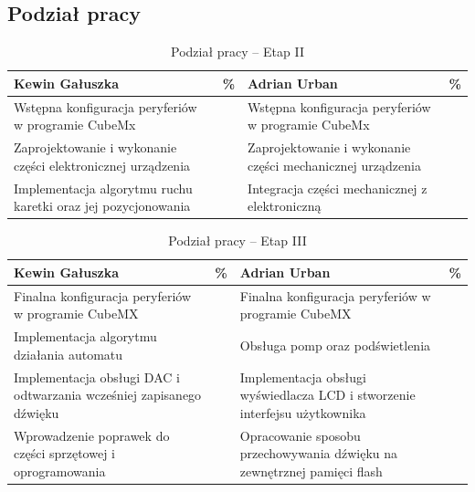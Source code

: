 \documentclass[10pt, a4paper]{article}
\begin{document}
\subsection{Podział pracy}

\textbf{}


\begin{table}[H]
	\centering
	\begin{tabular}{|L{7cm}|L{0.8cm}||L{7cm}|L{0.8cm}|}
		\hline
		\hline
		\textbf{Kewin Gałuszka} & 
		\% & 
		\textbf{Adrian Urban} & \%\\
		\hline
		\hline
		Wstępna konfiguracja peryferiów w programie CubeMx		& &	
		Wstępna konfiguracja peryferiów w programie CubeMx &\\
		
		\hline
		Zaprojektowanie i wykonanie części elektronicznej urządzenia& &
		Zaprojektowanie i wykonanie części mechanicznej urządzenia  & \\
		\hline
    	Implementacja algorytmu ruchu karetki oraz jej pozycjonowania & &
		Integracja części mechanicznej z elektroniczną &\\
		\hline
	\end{tabular}
	\caption{Podział pracy -- Etap II}
	\label{tab:PodzialPracyEtap2}
\end{table}

\begin{table}[H]
	\centering
	\begin{tabular}{|L{7cm}|L{0.8cm}||L{7cm}|L{0.8cm}|}
		\hline
		\hline
		\textbf{Kewin Gałuszka} & 
		\% & 
		\textbf{Adrian Urban} & \%\\
		\hline
		\hline
		Finalna konfiguracja peryferiów w programie CubeMX		& &	
		Finalna konfiguracja peryferiów w programie CubeMX &\\
		\hline
		Implementacja algorytmu działania automatu & &
		Obsługa pomp oraz podświetlenia &\\
		\hline
		Implementacja obsługi DAC i odtwarzania wcześniej zapisanego dźwięku & &
		Implementacja obsługi wyświedlacza LCD i stworzenie interfejsu użytkownika & \\
		\hline
		Wprowadzenie poprawek do części sprzętowej i oprogramowania & &
		Opracowanie sposobu przechowywania dźwięku na zewnętrznej pamięci flash &\\
		\hline
	\end{tabular}
	\caption{Podział pracy -- Etap III}
	\label{tab:PodzialPracyEtap3}
\end{table}

\end{document}
